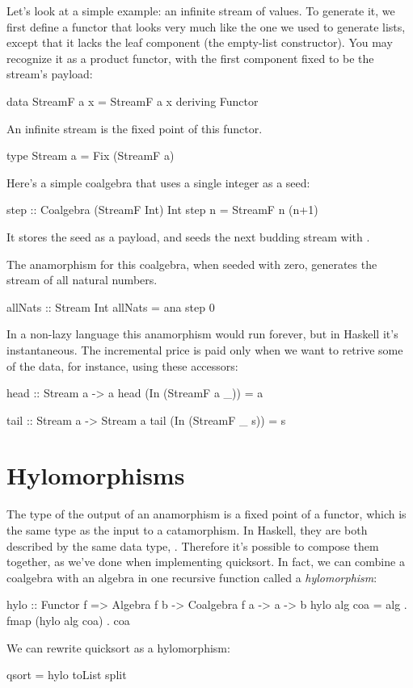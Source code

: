 \documentclass[DaoFP]{subfiles}
\begin{document}
Let's look at a simple example: an infinite stream of values. To generate it, we first define a functor that looks very much like the one we used to generate lists, except that it lacks the leaf component (the empty-list constructor). You may recognize it as a product functor, with the first component fixed to be the stream's payload:
\begin{haskell}
data StreamF a x = StreamF a x
  deriving Functor
\end{haskell}
An infinite stream is the fixed point of this functor.
\begin{haskell}
type Stream a = Fix (StreamF a)
\end{haskell}
Here's a simple coalgebra that uses a single integer  as a seed:
\begin{haskell}
step :: Coalgebra (StreamF Int) Int
step n = StreamF n (n+1)
\end{haskell}
It stores the seed as a payload, and seeds the next budding stream with . 

The anamorphism for this coalgebra, when seeded with zero, generates the stream of all natural numbers.
\begin{haskell}
allNats :: Stream Int
allNats = ana step 0
\end{haskell}
In a non-lazy language this anamorphism would run forever, but in Haskell it's instantaneous. The incremental price is paid only when we want to retrive some of the data, for instance, using these accessors:
\begin{haskell}
head :: Stream a -> a
head (In (StreamF a _)) = a

tail :: Stream a -> Stream a
tail (In (StreamF _ s)) = s
\end{haskell}


\section{Hylomorphisms}

The type of the output of an anamorphism is a fixed point of a functor, which is the same type as the input to a catamorphism. In Haskell, they are both described by the same data type, . Therefore it's possible to compose them together, as we've done when implementing quicksort. In fact, we can combine a coalgebra with an algebra in one recursive function called a \emph{hylomorphism}:
\begin{haskell}
hylo :: Functor f => Algebra f b -> Coalgebra f a -> a -> b
hylo alg coa = alg . fmap (hylo alg coa) . coa 
\end{haskell}
We can rewrite quicksort as a hylomorphism:
\begin{haskell}
qsort = hylo toList split
\end{haskell}
\end{document}
